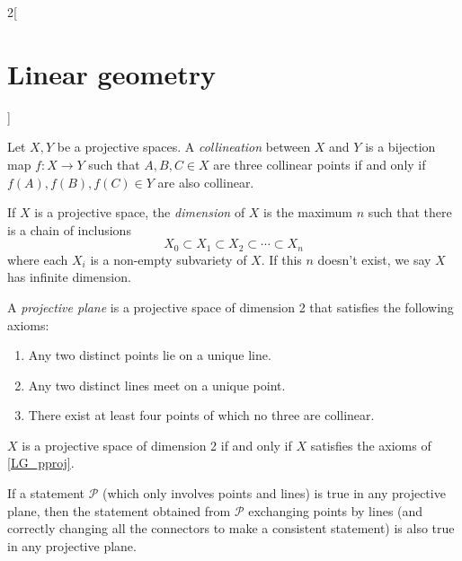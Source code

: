 \documentclass[../../../main.tex]{subfiles}
\begin{document}
\begin{multicols}{2}[\section{Linear geometry}]
\begin{proposition}
  \end{proposition}
  \begin{definition}
    Let $X,Y$ be a projective spaces. A \emph{collineation} between $X$ and $Y$ is a bijection map $f:X\rightarrow Y$ such that $A,B,C\in X$ are three collinear points if and only if $f(A),f(B),f(C)\in Y$ are also collinear.
  \end{definition}
  \begin{definition}
    If $X$ is a projective space, the \emph{dimension} of $X$ is the maximum $n$ such that there is a chain of inclusions $$X_0\subset X_1\subset X_2 \subset\cdots\subset X_n$$ where each $X_i$ is a non-empty subvariety of $X$. If this $n$ doesn't exist, we say $X$ has infinite dimension.
  \end{definition}
  \begin{definition}\label{LG_pproj}
    A \emph{projective plane} is a projective space of dimension 2 that satisfies the following axioms:
    \begin{enumerate}
      \item Any two distinct points lie on a unique line.
      \item Any two distinct lines meet on a unique point.
      \item There exist at least four points of which no three are collinear.
    \end{enumerate}
  \end{definition}
  \begin{theorem}
    $X$ is a projective space of dimension 2 if and only if $X$ satisfies the axioms of \cref{LG_pproj}.
  \end{theorem}
  \begin{theorem}
    If a statement $\mathcal{P}$ (which only involves points and lines) is true in any projective plane, then the statement obtained from $\mathcal{P}$ exchanging points by lines (and correctly changing all the connectors to make a consistent statement) is also true in any projective plane.
  \end{theorem}

\end{multicols}
\end{document}
